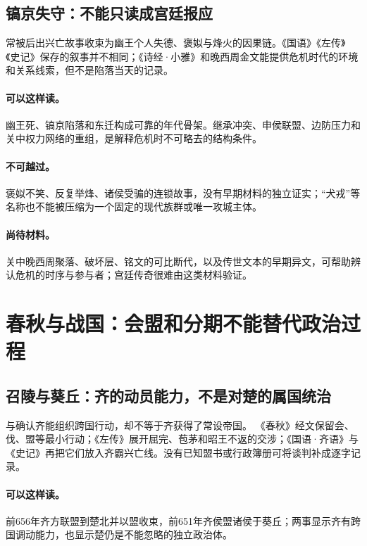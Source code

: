 \subsection{镐京失守：不能只读成宫廷报应}

常被后出兴亡故事收束为幽王个人失德、褒姒与烽火的因果链。《国语》《左传》《史记》保存的叙事并不相同；《诗经·小雅》和晚西周金文能提供危机时代的环境和关系线索，但不是陷落当天的记录。

\paragraph{可以这样读。}幽王死、镐京陷落和东迁构成可靠的年代骨架。继承冲突、申侯联盟、边防压力和关中权力网络的重组，是解释危机时不可略去的结构条件。

\paragraph{不可越过。}褒姒不笑、反复举烽、诸侯受骗的连锁故事，没有早期材料的独立证实；“犬戎”等名称也不能被压缩为一个固定的现代族群或唯一攻城主体。

\paragraph{尚待材料。}关中晚西周聚落、破坏层、铭文的可比断代，以及传世文本的早期异文，可帮助辨认危机的时序与参与者；宫廷传奇很难由这类材料验证。

\section{春秋与战国：会盟和分期不能替代政治过程}

\subsection{召陵与葵丘：齐的动员能力，不是对楚的属国统治}

与确认齐能组织跨国行动，却不等于齐获得了常设帝国。 《春秋》经文保留会、伐、盟等最小行动；《左传》展开屈完、苞茅和昭王不返的交涉；《国语·齐语》与《史记》再把它们放入齐霸兴亡线。没有已知盟书或行政簿册可将谈判补成逐字记录。

\paragraph{可以这样读。}前656年齐方联盟到楚北并以盟收束，前651年齐侯盟诸侯于葵丘；两事显示齐有跨国调动能力，也显示楚仍是不能忽略的独立政治体。

